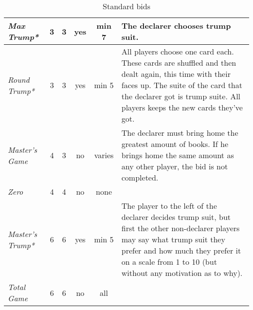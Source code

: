 \begin{table}
\begin{center}
{\begin{tabular*}{\textwidth}{ lcccc | p{5cm} }
					\textit{Max Trump*} &
					3 & 3 & yes & min 7 &
					The declarer chooses trump suit.
					\\ \hline
					
					\textit{Round Trump*} &
					3 & 3 & yes & min 5 &
					All players choose one card each. These cards are shuffled and then dealt again, this time with their faces up. The suite of the card that the declarer got is trump suite. All players keeps the new cards they've got.
					\\ \hline
					
					\textit{Master's Game} &
					4 & 3 & no & varies &
					The declarer must bring home the greatest amount of books. If he brings home the same amount as any other player, the bid is not completed. 
					\\ \hline
					
					\textit{Zero} &
					4 & 4 & no & none &
					\\ \hline
					
					\textit{Master's Trump*} &
					6 & 6 & yes & min 5 &
					The player to the left of the declarer decides trump suit, but first the other non-declarer players may say what trump suit they prefer and how much they prefer it on a scale from 1 to 10 (but without any motivation as to why).
					\\ \hline
					
					\textit{Total Game} &
					6 & 6 & no & all &
			\end{tabular*}
		}
	\end{center}
	\caption{Standard bids}
	\label{tab:standardBids}
\end{table}

